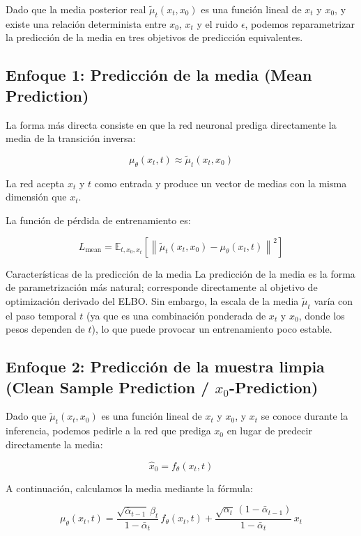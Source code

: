 \documentclass[a4paper]{article}
\begin{document}
Dado que la media posterior real $\tilde{\mu}_t(x_t, x_0)$ es una función lineal de $x_t$ y $x_0$, y existe una relación determinista entre $x_0$, $x_t$ y el ruido $\epsilon$, podemos reparametrizar la predicción de la media en tres objetivos de predicción equivalentes.

\subsection{Enfoque 1: Predicción de la media (Mean Prediction)}

La forma más directa consiste en que la red neuronal prediga directamente la media de la transición inversa:

$$\mu_\theta(x_t, t) \approx \tilde{\mu}_t(x_t, x_0)$$

La red acepta $x_t$ y $t$ como entrada y produce un vector de medias con la misma dimensión que $x_t$.

La función de pérdida de entrenamiento es:

$$L_{\text{mean}} = \mathbb{E}_{t, x_0, x_t}\left[\left\| \tilde{\mu}_t(x_t, x_0) - \mu_\theta(x_t, t) \right\|^2\right]$$

\begin{knowledgebox}{Características de la predicción de la media}
La predicción de la media es la forma de parametrización más natural; corresponde directamente al objetivo de optimización derivado del ELBO. Sin embargo, la escala de la media $\tilde{\mu}_t$ varía con el paso temporal $t$ (ya que es una combinación ponderada de $x_t$ y $x_0$, donde los pesos dependen de $t$), lo que puede provocar un entrenamiento poco estable.
\end{knowledgebox}

\subsection{Enfoque 2: Predicción de la muestra limpia (Clean Sample Prediction / $x_0$-Prediction)}

Dado que $\tilde{\mu}_t(x_t, x_0)$ es una función lineal de $x_t$ y $x_0$, y $x_t$ se conoce durante la inferencia, podemos pedirle a la red que prediga $x_0$ en lugar de predecir directamente la media:

$$\hat{x}_0 = f_\theta(x_t, t)$$

A continuación, calculamos la media mediante la fórmula:

$$\mu_\theta(x_t, t) = \frac{\sqrt{\bar{\alpha}_{t-1}}\, \beta_t}{1 - \bar{\alpha}_t}\, f_\theta(x_t, t) + \frac{\sqrt{\alpha_t}\, (1 - \bar{\alpha}_{t-1})}{1 - \bar{\alpha}_t}\, x_t$$
\end{document}
